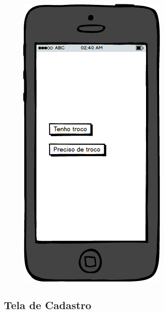 \documentclass[a4paper,10pt]{article}
\begin{document}
\begin{figure}[H]
    \centering
    \includegraphics[scale=0.7]{t1_img/Inicial.png}
\end{figure}

\subsection*{Tela de Cadastro}
\end{document}

